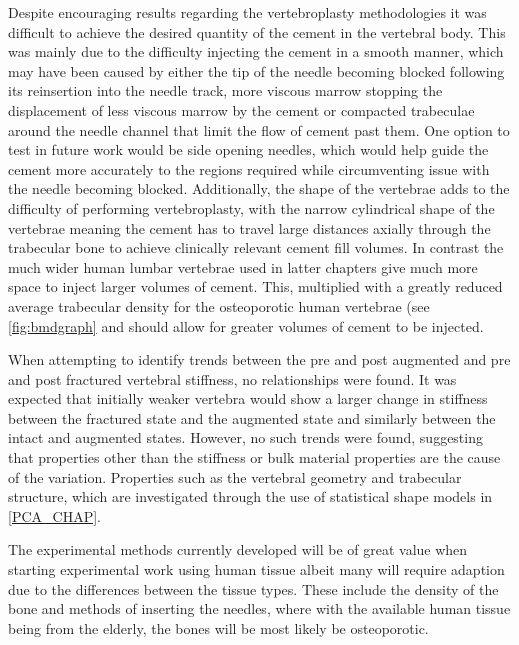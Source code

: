 Despite encouraging results regarding the vertebroplasty methodologies it was
difficult to achieve the desired quantity of the cement in the vertebral body.
This was mainly due to the difficulty injecting the cement in a smooth manner,
which may have been caused by either the tip of the needle becoming blocked
following its reinsertion into the needle track, more viscous marrow stopping
the displacement of less viscous marrow by the cement or compacted trabeculae
around the needle channel that limit the flow of cement past them.  One option
to test in future work would be side opening needles, which would help guide
the cement more accurately to the regions required while circumventing issue
with the needle becoming blocked.  Additionally, the shape of the vertebrae
adds to the difficulty of performing vertebroplasty, with the narrow
cylindrical shape of the vertebrae meaning the cement has to travel large
distances axially through the trabecular bone to achieve clinically relevant
cement fill volumes.  In contrast the much wider human lumbar vertebrae used in
latter chapters give much more space to inject larger volumes of cement.  This,
multiplied with a greatly reduced average trabecular density for the
osteoporotic human vertebrae (see \cref{fig:bmdgraph} and
\cite{aerssens_jeroen_boonen_steven_geert_dequeker_1998,wilke1997sheep} should
allow for greater volumes of cement to be injected. 

When attempting to identify trends between the pre and post augmented and pre
and post fractured vertebral stiffness, no relationships were found.  It was expected that
initially weaker vertebra would show a larger change in stiffness between the
fractured state and the augmented state and similarly between the intact and
augmented states.  However, no such trends were found, suggesting that
properties other than the stiffness or bulk material properties are the cause
of the variation.  Properties such as the vertebral geometry and trabecular
structure, which are investigated through the use of statistical shape models
in \cref{PCA_CHAP}.

The experimental methods currently developed will be of great value when
starting experimental work using human tissue albeit many will require adaption
due to the differences between the tissue types.  These include the density of
the bone and methods of inserting the needles, where with the available human
tissue being from the elderly, the bones will be most likely be osteoporotic.



